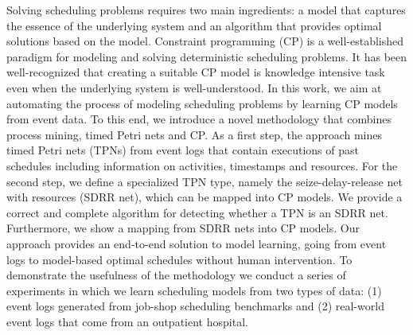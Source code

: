 Solving scheduling problems
requires two main ingredients: a model 
that captures 
the essence of the underlying system and an algorithm that 
provides optimal solutions based on the model.
Constraint programming (CP) is a well-established
paradigm for modeling and solving deterministic
scheduling problems.  
It has been well-recognized that creating a suitable CP model is knowledge intensive 
task even when the underlying system is 
well-understood.  
In this work, we
aim at 
automating
the process of 
modeling scheduling problems
by learning CP models from event data.
To this end, 
we introduce
a novel methodology 
that combines process mining, 
timed Petri nets and CP.
As a first step, the approach
mines
timed Petri nets (TPNs) from event logs
that contain
executions of past schedules including
information on activities, timestamps and resources.
For the second step, 
we define a specialized TPN type,
namely the seize-delay-release net with 
resources (SDRR net),
which can be mapped into CP models. 
We provide a correct and complete algorithm
for detecting whether a TPN is an SDRR net.
Furthermore, we show a
mapping from SDRR nets into CP models.
Our approach provides an end-to-end solution
to model learning, going from 
event logs to model-based optimal schedules
without human intervention. 
To demonstrate the usefulness 
of the methodology we conduct
a series of experiments in which we
learn scheduling models from
two types of data: (1) event logs generated from 
job-shop scheduling benchmarks and (2) real-world event
logs that come from an outpatient hospital. 
